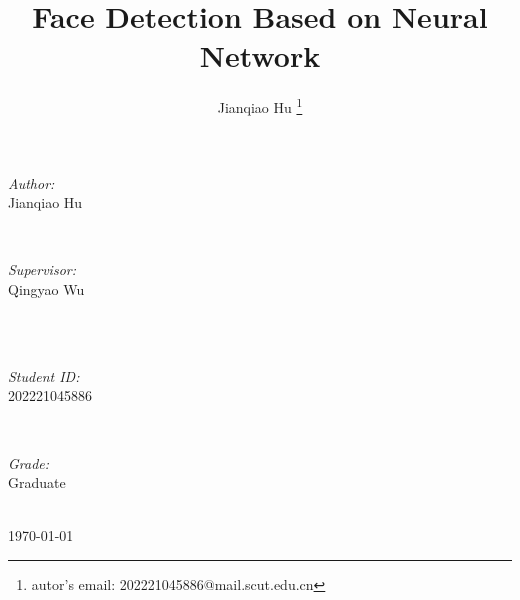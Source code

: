 \documentclass[journal, a4paper]{IEEEtran}
\begin{document}
\begin{titlepage}
\begin{minipage}{0.4\textwidth}
\begin{flushleft} \large
\emph{Author:}\\
Jianqiao Hu %
\end{flushleft}
\end{minipage}
~
\begin{minipage}{0.4\textwidth}
\begin{flushright} \large
\emph{Supervisor:} \\
Qingyao Wu %
\end{flushright}
\end{minipage}\\[2cm]
~
\begin{minipage}{0.4\textwidth}
\begin{flushleft} \large
\emph{Student ID:}\\
202221045886
\end{flushleft}
\end{minipage}
~
\begin{minipage}{0.4\textwidth}
\begin{flushright} \large
\emph{Grade:} \\
Graduate
\end{flushright}
\end{minipage}\\[2cm]



{\large \today}\\[2cm] %

 

\vfill %

\end{titlepage}


	\title{Face Detection Based on Neural Network}
	\author{Jianqiao Hu \thanks{autor's email: 202221045886@mail.scut.edu.cn}}
	\maketitle
\end{document}
